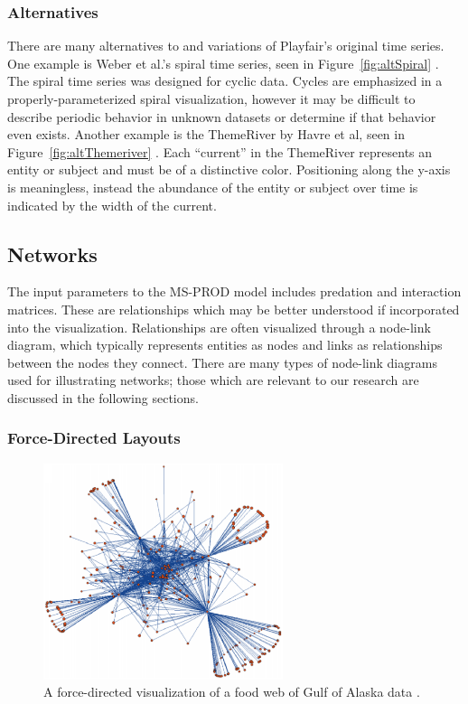 \subsubsection{Alternatives}

There are many alternatives to and variations of Playfair's original time series.  One example is Weber et al.'s spiral time series, seen in Figure~\ref{fig:altSpiral} \cite{weber2001}.  The spiral time series was designed for cyclic data.  Cycles are emphasized in a properly-parameterized spiral visualization, however it may be difficult to describe periodic behavior in unknown datasets or determine if that behavior even exists. Another example is the ThemeRiver by Havre et al, seen in Figure~\ref{fig:altThemeriver} \cite{havre2000}.  Each ``current'' in the ThemeRiver represents an entity or subject and must be of a distinctive color.  Positioning along the y-axis is meaningless, instead the abundance of the entity or subject over time is indicated by the width of the current. 

\subsection{Networks}

The input parameters to the MS-PROD model includes predation and interaction matrices.  These are relationships which may be better understood if incorporated into the visualization. Relationships are often visualized through a node-link diagram, which typically represents entities as nodes and links as relationships between the nodes they connect.  There are many types of node-link diagrams used for illustrating networks; those which are relevant to our research are discussed in the following sections.

\subsubsection{Force-Directed Layouts}

\begin{figure}[h]
	\centering
	\includegraphics[width=7cm]{figures/eps/gaichas.eps}
	\caption{A force-directed visualization of a food web of Gulf of Alaska data \cite{gaichas2008}.}
	\label{fig:gaichas}
\end{figure}

